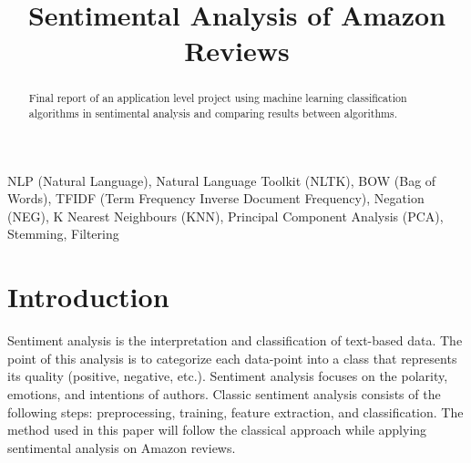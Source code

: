 \documentclass[conference , 11pt]{IEEEtran}
\begin{document}
\title{Sentimental Analysis of Amazon Reviews\\
}

\author{
\and
{}
\and
{}
}

\maketitle

\begin{abstract}
Final report of an application level project using machine learning classification algorithms in sentimental analysis and comparing results between algorithms. 
\end{abstract}

\begin{IEEEkeywords}
NLP (Natural Language), Natural Language Toolkit (NLTK), BOW (Bag of Words), TFIDF (Term Frequency Inverse Document Frequency), Negation (NEG), K Nearest Neighbours (KNN), Principal Component Analysis (PCA), Stemming, Filtering
\end{IEEEkeywords}

\section{Introduction}
Sentiment analysis is the interpretation and classification of text-based data. The point of this analysis is to categorize each data-point into a class that represents its quality (positive, negative, etc.). Sentiment analysis focuses on the polarity, emotions, and intentions of authors. Classic sentiment analysis consists of the following steps: preprocessing, training, feature extraction, and classification. The method used in this paper will follow the classical approach while applying sentimental analysis on Amazon reviews.
\end{document}
